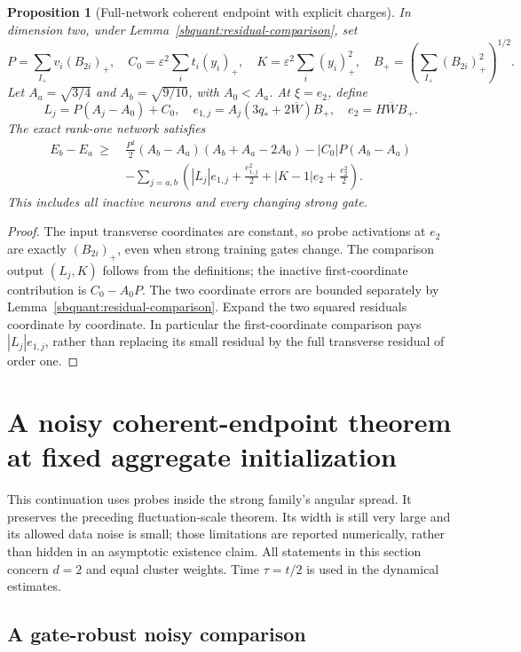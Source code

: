 \documentclass[11pt]{article}
\newtheorem{proposition}[theorem]{Proposition}
\theoremstyle{remark}
\begin{document}
\begin{proposition}[Full-network coherent endpoint with explicit charges]
\label{sbquant:coherent-finite}
In dimension two, under Lemma~\ref{sbquant:residual-comparison}, set
\[
 P=\sum_{I_+}v_i(B_{2i})_+,\quad
 C_0=\varepsilon^2\sum_i t_i(y_i)_+,\quad
 K=\varepsilon^2\sum_i(y_i)_+^2,\quad
 B_+=\left(\sum_{I_+}(B_{2i})_+^2\right)^{1/2}.
\]
Let $A_a=\sqrt{3/4}$ and $A_b=\sqrt{9/10}$, with $A_0<A_a$.
At $\xi=e_2$, define
\[
 L_j=P(A_j-A_0)+C_0,\quad
 e_{1,j}=A_j(3q_*+2\overline W)B_+,\quad
 e_2=H\overline W B_+.
\]
The exact rank-one network satisfies
\begin{align}\label{sbquant:coherent-finite-gap}
 E_b-E_a\ \ge\ &\frac{P^2}{2}(A_b-A_a)(A_b+A_a-2A_0)
                  -|C_0|P(A_b-A_a)\\
 &-\sum_{j=a,b}\left(|L_j|e_{1,j}+\frac{e_{1,j}^2}{2}
                   +|K-1|e_2+\frac{e_2^2}{2}\right).\nonumber
\end{align}
This includes all inactive neurons and every changing strong gate.
\end{proposition}
\begin{proof}
The input transverse coordinates are constant, so probe activations at
$e_2$ are exactly $(B_{2i})_+$, even when strong training gates change.
The comparison output $(L_j,K)$ follows from the definitions; the inactive
first-coordinate contribution is $C_0-A_0P$.
The two coordinate errors are bounded separately by
Lemma~\ref{sbquant:residual-comparison}.
Expand the two squared residuals coordinate by coordinate. In particular
the first-coordinate comparison pays $|L_j|e_{1,j}$, rather than replacing
its small residual by the full transverse residual of order one.
\end{proof}

\section{A noisy coherent-endpoint theorem at fixed aggregate initialization}
\label{sbwide:scope}

This continuation uses probes inside the strong family's angular spread.
It preserves the preceding fluctuation-scale theorem. Its width is still
very large and its allowed data noise is small; those limitations are
reported numerically, rather than hidden in an asymptotic existence claim.
All statements in this section concern $d=2$ and equal cluster weights.
Time $\tau=t/2$ is used in the dynamical estimates.

\subsection{A gate-robust noisy comparison}
\end{document}
